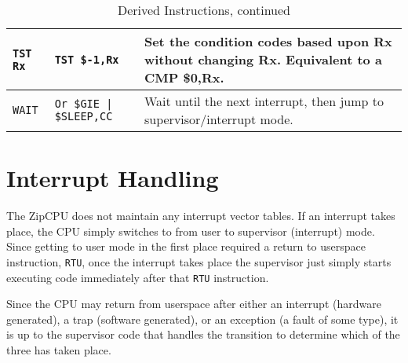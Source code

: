 \documentclass{gqtekspec}
\begin{document}
\begin{table}\begin{center}
\begin{tabular}{p{1.0in}p{1.5in}p{3in}}\\\hline
{\tt TST Rx}
	& {\tt TST \$-1,Rx}
	& Set the condition codes based upon Rx without changing Rx.
	Equivalent to a CMP \$0,Rx.\\\hline
{\tt WAIT}
	& {\tt Or \$GIE | \$SLEEP,CC}
	& Wait until the next interrupt, then jump to supervisor/interrupt
	mode.
\end{tabular}
\caption{Derived Instructions, continued}\label{tbl:derived-4}
\end{center}\end{table}

\section{Interrupt Handling}
The ZipCPU does not maintain any interrupt vector tables.  If an interrupt
takes place, the CPU simply switches to from user to supervisor (interrupt)
mode.  Since getting to user mode in the first place required a return to
userspace instruction, {\tt RTU}, once the interrupt takes place the 
supervisor just simply starts executing code immediately after that
{\tt RTU} instruction.

Since the CPU may return from userspace after either an interrupt (hardware
generated), a trap (software generated), or an exception (a fault of some
type), it is up to the supervisor code that handles the transition to
determine which of the three has taken place.

\iffalse
\end{document}
